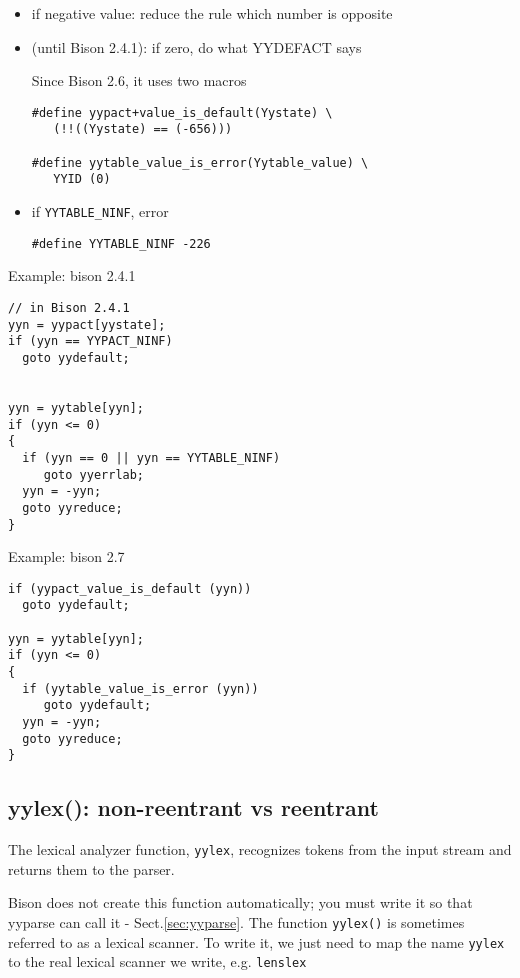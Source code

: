 \begin{enumerate}
\begin{itemize}
  \item if negative value: reduce the rule which number is opposite
  
  \item (until Bison 2.4.1): if zero, do what YYDEFACT says

Since Bison 2.6, it uses two macros
\begin{verbatim}
#define yypact+value_is_default(Yystate) \
   (!!((Yystate) == (-656)))
   
#define yytable_value_is_error(Yytable_value) \
   YYID (0)
\end{verbatim}
  
  \item if \verb!YYTABLE_NINF!, error
  
\begin{verbatim}
#define YYTABLE_NINF -226
\end{verbatim}
\end{itemize}

Example: bison 2.4.1
\begin{verbatim}
// in Bison 2.4.1
yyn = yypact[yystate];
if (yyn == YYPACT_NINF)
  goto yydefault;


yyn = yytable[yyn];
if (yyn <= 0)
{
  if (yyn == 0 || yyn == YYTABLE_NINF)
     goto yyerrlab;
  yyn = -yyn;
  goto yyreduce;
}
\end{verbatim}

Example: bison 2.7
\begin{verbatim}
if (yypact_value_is_default (yyn))
  goto yydefault;
  
yyn = yytable[yyn];
if (yyn <= 0)
{
  if (yytable_value_is_error (yyn))
     goto yydefault;
  yyn = -yyn;
  goto yyreduce;
}
\end{verbatim}
\end{enumerate}




\subsection{yylex(): non-reentrant vs reentrant}
\label{sec:yylex}

The lexical analyzer function, \verb!yylex!, recognizes tokens from the input stream
and returns them to the parser. 

Bison does not create this function automatically; you must write it so that
yyparse can call it - Sect.\ref{sec:yyparse}. The function \verb!yylex()! is
sometimes referred to as a lexical scanner. To write it, we just need to map the
name \verb!yylex! to the real lexical scanner we write, e.g. \verb!lenslex!



